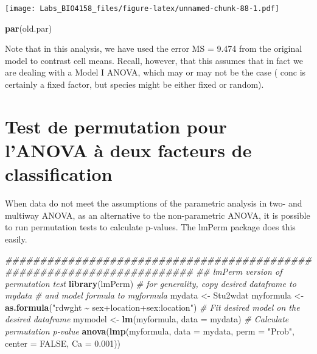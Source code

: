 \documentclass[
  12pt,
]{book}
\newenvironment{Shaded}{\begin{snugshade}}{\end{snugshade}}
\newcommand{\CommentTok}[1]{\textcolor[rgb]{0.56,0.35,0.01}{\textit{#1}}}
\newcommand{\DataTypeTok}[1]{\textcolor[rgb]{0.13,0.29,0.53}{#1}}
\newcommand{\FloatTok}[1]{\textcolor[rgb]{0.00,0.00,0.81}{#1}}
\newcommand{\KeywordTok}[1]{\textcolor[rgb]{0.13,0.29,0.53}{\textbf{#1}}}
\newcommand{\NormalTok}[1]{#1}
\newcommand{\OtherTok}[1]{\textcolor[rgb]{0.56,0.35,0.01}{#1}}
\newcommand{\StringTok}[1]{\textcolor[rgb]{0.31,0.60,0.02}{#1}}
\begin{document}
\texttt{[image: Labs\_BIO4158\_files/figure-latex/unnamed-chunk-88-1.pdf]}

\begin{Shaded}
\begin{Highlighting}[]
\KeywordTok{par}\NormalTok{(old.par)}
\end{Highlighting}
\end{Shaded}

Note that in this analysis, we have used the error MS = 9.474 from the original model to contrast cell means. Recall, however, that this assumes that in fact we are dealing with a Model I ANOVA, which may or may not be the case ( conc is certainly a fixed factor, but species might be either fixed or random).

\hypertarget{test-de-permutation-pour-lanova-uxe0-deux-facteurs-de-classification}{%
\section{Test de permutation pour l'ANOVA à deux facteurs de classification}\label{test-de-permutation-pour-lanova-uxe0-deux-facteurs-de-classification}}

When data do not meet the assumptions of the parametric analysis in two- and multiway ANOVA, as an alternative to the non-parametric ANOVA, it is possible to run permutation tests to calculate p-values. The lmPerm package does this easily.

\begin{Shaded}
\begin{Highlighting}[]
\CommentTok{\#\#\#\#\#\#\#\#\#\#\#\#\#\#\#\#\#\#\#\#\#\#\#\#\#\#\#\#\#\#\#\#\#\#\#\#\#\#\#\#\#\#\#\#\#\#\#\#\#\#\#\#\#\#\#\#\#\#\#\#\#\#\#\#\#\#\#\#\#\#\#}
\CommentTok{\#\# lmPerm version of permutation test}
\KeywordTok{library}\NormalTok{(lmPerm)}
\CommentTok{\# for generality, copy desired dataframe to mydata}
\CommentTok{\# and model formula to myformula}
\NormalTok{mydata \textless{}{-}}\StringTok{ }\NormalTok{Stu2wdat}
\NormalTok{myformula \textless{}{-}}\StringTok{ }\KeywordTok{as.formula}\NormalTok{(}\StringTok{"rdwght \textasciitilde{} sex+location+sex:location"}\NormalTok{)}
\CommentTok{\# Fit desired model on the desired dataframe}
\NormalTok{mymodel \textless{}{-}}\StringTok{ }\KeywordTok{lm}\NormalTok{(myformula, }\DataTypeTok{data =}\NormalTok{ mydata)}
\CommentTok{\# Calculate permutation p{-}value}
\KeywordTok{anova}\NormalTok{(}\KeywordTok{lmp}\NormalTok{(myformula, }\DataTypeTok{data =}\NormalTok{ mydata, }\DataTypeTok{perm =} \StringTok{"Prob"}\NormalTok{, }\DataTypeTok{center =} \OtherTok{FALSE}\NormalTok{, }\DataTypeTok{Ca =} \FloatTok{0.001}\NormalTok{))}
\end{Highlighting}
\end{Shaded}
\end{document}
